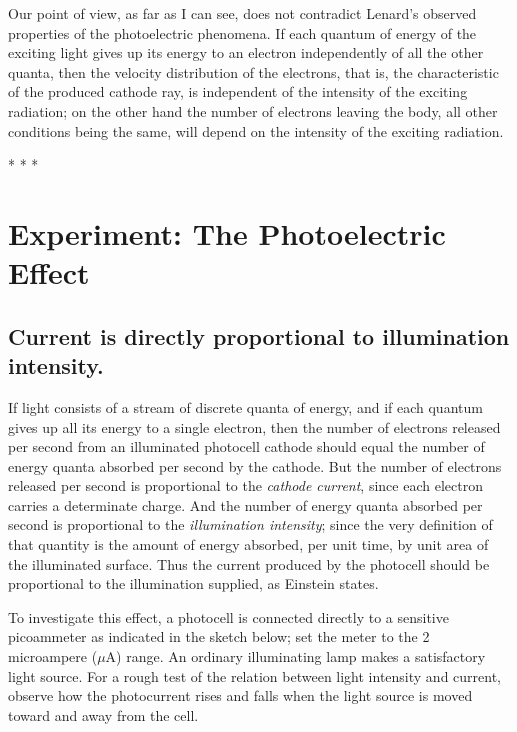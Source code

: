 Our point of view, as far as I can see, does not contradict Lenard's
observed properties of the photoelectric phenomena. If each quantum of
energy of the exciting light gives up its energy to an electron
independently of all the other quanta, then the velocity distribution of
the electrons, that is, the characteristic of the produced cathode ray,
is independent of the intensity of the exciting radiation; on the other
hand the number of electrons leaving the body, all other conditions
being the same, will depend on the intensity of the exciting 
radiation.\\
\centerline{* * *}

\section*{Experiment: The Photoelectric Effect}

\subsection{Current is directly proportional to illumination intensity.}

If light consists of a stream of discrete quanta of energy, and if each
quantum gives up all its energy to a single electron, then the number of
electrons released per second from an illuminated photocell cathode
should equal the number of energy quanta absorbed per second by the
cathode. But the number of electrons released per second is proportional
to the \emph{cathode current}, since each electron carries a determinate
charge. And the number of energy quanta absorbed per second is
proportional to the \emph{illumination intensity}; since the very
definition of that quantity is the amount of energy absorbed, per unit
time, by unit area of the illuminated surface. Thus the current produced
by the photocell should be proportional to the illumination supplied, as
Einstein states.

To investigate this effect, a photocell is connected directly to a
sensitive picoammeter as indicated in the sketch below; set the meter to
the 2 microampere ($\mu\text{A}$) range. An ordinary
illuminating lamp makes a satisfactory light source. For a rough test of
the relation between light intensity and current, observe how the
photocurrent rises and falls when the light source is moved toward and
away from the cell.

